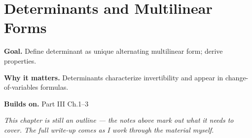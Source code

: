 \chapter{Determinants and Multilinear Forms}
\label{ch:03-linear-algebra-04}

\begin{chapterintro}
\textbf{Goal.} Define determinant as unique alternating multilinear form; derive properties.

\textbf{Why it matters.} Determinants characterize invertibility and appear in change-of-variables formulas.

\textbf{Builds on.} Part III Ch.1–3
\end{chapterintro}

\textit{This chapter is still an outline --- the notes above mark out what it needs to cover. The full write-up comes as I work through the material myself.}
